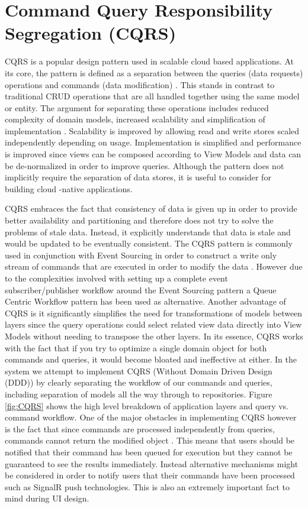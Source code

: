  
 \section{Command Query Responsibility Segregation (CQRS)}
 
CQRS is a popular design pattern used in scalable cloud based applications. At its core, the pattern is defined as a separation between the queries (data requests) operations and commands (data modification) \cite{Swanson}. This stands in contrast to traditional CRUD operations that are all handled together using the same model or entity. The argument for separating these operations includes reduced complexity of domain models, increased scalability and simplification of implementation \cite{Swanson}. Scalability is improved by allowing read and write stores scaled independently depending on usage. Implementation is simplified and performance is improved since views can be composed according to View Models and data can be de-normalized in order to improve queries. Although the pattern does not implicitly require the separation of data stores, it is useful to consider for building cloud -native applications. 
 
CQRS embraces the fact that consistency of data is given up in order to provide better availability and partitioning and therefore does not try to solve the problems of stale data. Instead, it explicitly understands that data is stale and would be updated to be eventually consistent. The CQRS pattern is commonly used in conjunction with Event Sourcing in order to construct a write only stream of commands that are executed in order to modify the data \cite{Swanson}. However due to the complexities involved with setting up a complete event subscriber/publisher workflow around the Event Sourcing pattern a Queue Centric Workflow pattern has been used as alternative. Another advantage of CQRS is it significantly simplifies the need for transformations of models between layers since the query operations could select related view data directly into View Models without needing to transpose the other layers. In its essence, CQRS works with the fact that if you try to optimize a single domain object for both commands and queries, it would become bloated and ineffective at either. In the system we attempt to implement CQRS (Without Domain Driven Design (DDD)) by clearly separating the workflow of our commands and queries, including separation of models all the way through to repositories. Figure \ref{fig:CQRS} shows the high level breakdown of application layers and query vs. command workflow. One of the major obstacles in implementing CQRS however is the fact that since commands are processed independently from queries, commands cannot return the modified object \cite{Swanson}. This means that users should be notified that their command has been queued for execution but they cannot be guaranteed to see the results immediately. Instead alternative mechanisms might be considered in order to notify users that their commands have been processed such as SignalR push technologies. This is also an extremely important fact to mind during UI design.
 
